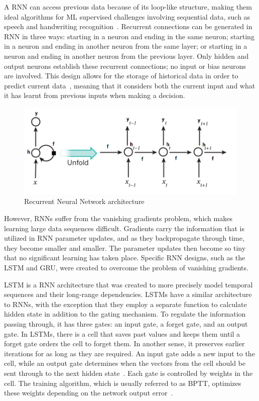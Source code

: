 A \gls{RNN} can access previous data because of its loop-like structure, making them ideal algorithms for \gls{ML} supervised challenges involving sequential data, such as speech and handwriting recognition~\cite{Ganatra2018ATools}. Recurrent connections can be generated in \gls{RNN} in three ways: starting in a neuron and ending in the same neuron; starting in a neuron and ending in another neuron from the same layer; or starting in a neuron and ending in another neuron from the previous layer. Only hidden and output neurons establish these recurrent connections; no input or bias neurons are involved. This design allows for the storage of historical data in order to predict current data~\cite{ShewalkarComparisonData}, meaning that it considers both the current input and what it has learnt from previous inputs when making a decision.

\begin{figure}[htbp]
    \centering
    \includegraphics[width=0.75\linewidth]{Chapters/Figures/rnn.png}
    \caption{Recurrent Neural Network architecture~\cite{Gupta2017RecurrentLearning}}
    \label{fig:rnn}
\end{figure}

However, RNNs suffer from the vanishing gradients problem, which makes learning large data sequences difficult. Gradients carry the information that is utilized in \gls{RNN} parameter updates, and as they backpropagate through time, they become smaller and smaller. The parameter updates then become so tiny that no significant learning has taken place. Specific \gls{RNN} designs, such as the \gls{LSTM} and \gls{GRU}, were created to overcome the problem of vanishing gradients.

\gls{LSTM} is a \gls{RNN} architecture that was created to more precisely model temporal sequences and their long-range dependencies. \gls{LSTM}s have a similar architecture to RNNs, with the exception that they employ a separate function to calculate hidden state in addition to the gating mechanism. To regulate the information passing through, it has three gates: an input gate, a forget gate, and an output gate. In \gls{LSTM}s, there is a cell that saves past values and keeps them until a forget gate orders the cell to forget them. In another sense, it preserves earlier iterations for as long as they are required. An input gate adds a new input to the cell, while an output gate determines when the vectors from the cell should be sent through to the next hidden state~\cite{Khan2019RNN-LSTM-GRUTransformation}. Each gate is controlled by weights in the cell. The training algorithm, which is usually referred to as \gls{BPTT}, optimizes these weights depending on the network output error~\cite{Madhavan2021DeepDeveloper}.

